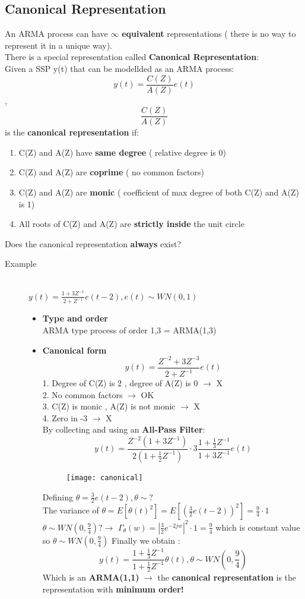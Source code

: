 \subsection{Canonical Representation}
An ARMA process can have $\infty$ \textbf{equivalent} representations ( there is no way to represent it in a unique way).\\
There is a special representation called \textbf{Canonical Representation}: \\
Given a SSP y(t) that can be modellded as an ARMA process: $$ y(t) = \frac{C(Z)}{A(Z)}e(t)$$ , $$ \frac{C(Z)}{A(Z)}$$ is the \textbf{canonical representation} if:
\begin{enumerate}
\item C(Z) and A(Z) have \textbf{same degree} ( relative degree is 0)
\item C(Z) and A(Z) are \textbf{coprime} ( no common factors)
\item C(Z) and A(Z) are  \textbf{monic} ( coefficient of max degree of both C(Z) and A(Z) is 1)
\item All roots of C(Z) and A(Z) are \textbf{strictly inside} the unit circle
\end{enumerate}
Does the canonical representation \textbf{always} exist?\\
\begin{description}
\item[Example]\hfill\\
$ y(t) = \frac{1+3Z^{-1}}{2+Z^{-1}}e(t-2) , e(t) \sim WN(0,1)$
\begin{itemize}
\item \textbf{Type and order}\\
ARMA type process of order 1,3 = ARMA(1,3)
\item \textbf{Canonical form}\\
$$ y(t) = \frac{Z^{-2} + 3Z^{-3}}{2+Z^{-1}} e(t)$$
1. Degree of C(Z) is 2 , degree of A(Z) is 0 $\to$ X\\
2. No common factors $\to$ OK\\
3. C(Z) is monic , A(Z) is not monic $\to$ X\\
4. Zero in -3 $\to$ X \\
By collecting  and using an \textbf{All-Pass Filter}:
$$ y(t) =  \frac{Z^{-2}(1+3Z^{-1})}{2(1+\frac{1}{2}Z^{-1})} \cdot 3 \frac{1+\frac{1}{3}Z^{-1}}{1+3Z^{-1}}e(t)$$ 
\begin{figure}[H]
 \centering
  \texttt{[image: canonical]}
\end{figure}
Defining $\theta = \frac{3}{2}e(t-2) , \theta \sim ? $\\
The variance of $\theta = E[\theta(t)^2]= E[(\frac{3}{2}e(t-2))^2] = \frac{9}{4}\cdot 1$\\
$\theta \sim WN(0,\frac{9}{4}) ? \to$ $ \Gamma_\theta(w)= |\frac{3}{2}e^{-2jw}|^2 \cdot 1 = \frac{9}{4} $ which is constant value so $\theta \sim WN(0,\frac{9}{4})$
Finally we obtain : 
\[
\boxed{y(t) =\frac{1+\frac{1}{3}Z^{-1}}{1+\frac{1}{2}Z^{-1}}\theta(t) , \theta \sim WN(0,\frac{9}{4})}
\]
Which is an \textbf{ARMA(1,1)} $\to$ the \textbf{canonical representation} is the representation with \textbf{minimum order!}

\end{itemize}
\end{description}
